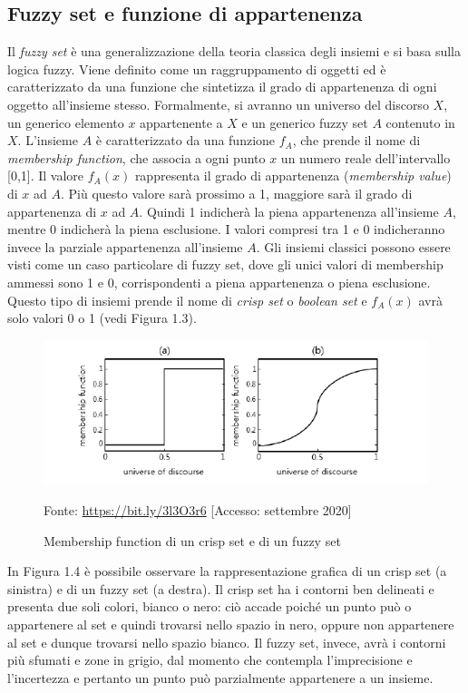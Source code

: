 \documentclass[11pt,  oneside, openany]{book}
\newcommand{\source}[1]{\caption*{Fonte: {#1}} }
\begin{document}
\subsection{Fuzzy set e funzione di appartenenza}
Il \textit{fuzzy set} è una generalizzazione della teoria classica degli insiemi e si basa sulla logica fuzzy. Viene definito come un raggruppamento di oggetti ed è caratterizzato da una funzione che sintetizza il grado di appartenenza di ogni oggetto all'insieme stesso. Formalmente, si avranno un universo del discorso $X$, un generico elemento $x$  appartenente a $X$ e un generico fuzzy set $A$ contenuto in $X$. L'insieme $A$ è caratterizzato da una funzione $f_A$, che prende il nome di \textit{membership function}, che associa a ogni punto $x$ un numero reale dell'intervallo [0,1]. Il valore $f_A(x)$ rappresenta il grado di appartenenza (\textit {membership value}) di $x$ ad $A$. Più questo valore sarà prossimo a 1, maggiore sarà il grado di appartenenza di $x$ ad $A$. Quindi 1 indicherà la piena appartenenza all'insieme $A$, mentre 0 indicherà la piena esclusione. I valori compresi tra 1 e 0 indicheranno invece la parziale appartenenza all'insieme $A$. Gli insiemi classici possono essere visti come un caso particolare di fuzzy set, dove gli unici valori di membership ammessi sono 1 e 0, corrispondenti a piena appartenenza o piena esclusione. Questo tipo di insiemi prende il nome di \textit{crisp set} o \textit{boolean set} e $f_A(x)$ avrà solo valori 0 o 1 (vedi Figura 1.3). 


\begin{figure}[h!]
\begin{center}
  \includegraphics[width=13cm]{Immagini/membfunctcrispvsfuzzy.png}\\
  \caption{Membership function di un crisp set e di un fuzzy set}
  \source{\url{https://bit.ly/3l3O3r6} [Accesso: settembre 2020]}
\end{center}
\end{figure}

In Figura 1.4 è possibile osservare la rappresentazione grafica di un crisp set (a sinistra) e di un fuzzy set (a destra). Il crisp set ha i contorni ben delineati e presenta due soli colori, bianco o nero: ciò accade poiché un punto può o appartenere al set e quindi trovarsi nello spazio in nero, oppure non appartenere al set e dunque trovarsi nello spazio bianco. Il fuzzy set, invece, avrà i contorni più sfumati e zone in grigio, dal momento che contempla l'imprecisione e l'incertezza e pertanto un punto può parzialmente appartenere a un insieme. 
\end{document}

